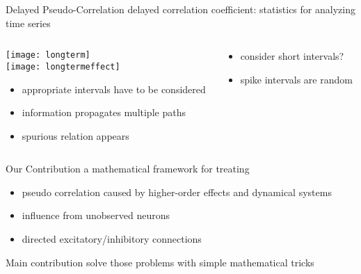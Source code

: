 \documentclass[fleqn,aspectratio=1610]{beamer}
\begin{document}
\begin{frame}[label={sec:org3e1977e}]{Delayed Pseudo-Correlation}
delayed correlation coefficient:
statistics for analyzing time series

\medskip
\begin{columns}
\begin{column}[t]{0.5\columnwidth}
\centering
\texttt{[image: longterm]}\\[0pt]
\texttt{[image: longtermeffect]}
\begin{itemize}
\item appropriate intervals have to be considered
\item information propagates multiple paths
\item spurious relation appears
\end{itemize}
\end{column}
\begin{column}[t]{0.5\columnwidth}
\centering
{}
\begin{itemize}
\item <2-> consider short intervals?
\end{itemize}
\begin{itemize}
\item <3-> spike intervals are random
\end{itemize}
\end{column}
\end{columns}
\end{frame}

\begin{frame}[label={sec:orgb935d7f}]{Our Contribution}
a mathematical framework for treating

\begin{itemize}
\item pseudo correlation caused by 
higher-order effects and dynamical systems
\item influence from unobserved neurons
\item directed excitatory/inhibitory connections
\end{itemize}

\pause
\bigskip
\begin{alertblock}{Main contribution}
solve those problems with simple mathematical tricks
\end{alertblock}
\end{frame}
\end{document}
